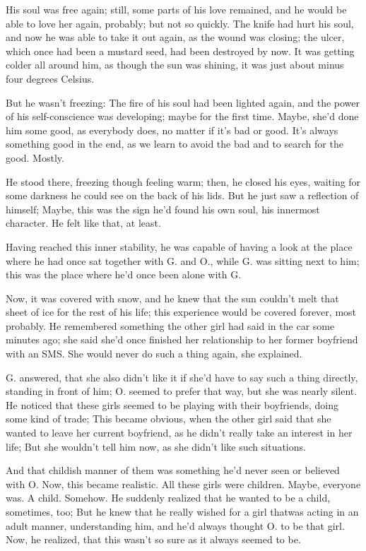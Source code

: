 His soul was free again; still, some parts of his love remained, and he would be able to love her again, probably; but not so quickly. 
The knife had hurt his soul, and now he was able to take it out again, as the wound was closing; the ulcer, which once had been a mustard seed, had been destroyed by now. 
It was getting colder all around him, as though the sun was shining, it was just about minus four degrees Celsius.

But he wasn't freezing: The fire of his soul had been lighted again, and the power of his self-conscience was developing; maybe for the first time. 
Maybe, she'd done him some good, as everybody does, no matter if it's bad or good. 
It's always something good in the end, as we learn to avoid the bad and to search for the good. 
Mostly.

He stood there, freezing though feeling warm; then, he closed his eyes, waiting for some darkness he could see on the back of his lids. 
But he just saw a reflection of himself; Maybe, this was the sign he'd found his own soul, his innermost character. 
He felt like that, at least.

Having reached this inner stability, he was capable of having a look at the place where he had once sat together with G. and O., while G. was sitting next to him; this was the place where he'd once been alone with G.

Now, it was covered with snow, and he knew that the sun couldn't melt that sheet of ice for the rest of his life; this experience would be covered forever, most probably. 
He remembered something the other girl had said in the car some minutes ago; she said she'd once finished her relationship to her former boyfriend with an SMS. 
She would never do such a thing again, she explained.

G. answered, that she also didn't like it if she'd have to say such a thing directly, standing in front of him; O. seemed to prefer that way, but she was nearly silent. 
He noticed that these girls seemed to be playing with their boyfriends, doing some kind of trade; This became obvious, when the other girl said that she wanted to leave her current boyfriend, as he didn't really take an interest in her life; But she wouldn't tell him now, as she didn't like such situations.

And that childish manner of them was something he'd never seen or believed with O. 
Now, this became realistic. 
All these girls were children. 
Maybe, everyone was. 
A child. 
Somehow. 
He suddenly realized that he wanted to be a child, sometimes, too; But he knew that he really wished for a girl thatwas acting in an adult manner, understanding him, and he'd always thought O. to be that girl.
Now, he realized, that this wasn't so sure as it always seemed to be.

